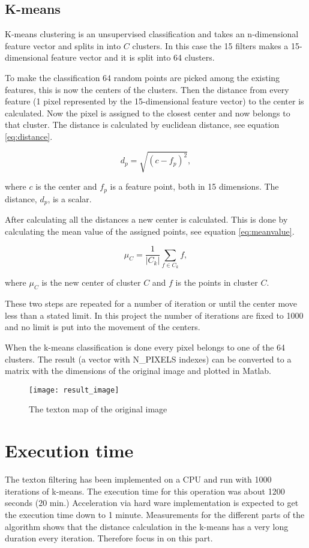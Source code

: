 \subsection{K-means}
\label{sec:Kmeans}
K-means clustering is an unsupervised classification and takes an n-dimensional feature vector and splits in into $C$ clusters. 
In this case the 15 filters makes a 15-dimensional feature vector and it is split into 64 clusters. 

To make the classification 64 random points are picked among the existing features, this is now the centers of the clusters. 
Then the distance from every feature (1 pixel represented by the 15-dimensional feature vector) to the center is calculated. 
Now the pixel is assigned to the closest center and now belongs to that cluster. 
The distance is calculated by euclidean distance, see equation \ref{eq:distance}.

\begin{equation}
\label{eq:distance}
d_p = \sqrt{(c-f_p)^2},
\end{equation}

where $c$ is the center and $f_p$ is a feature point, both in 15 dimensions. The distance, $d_p$, is a scalar.

After calculating all the distances a new center is calculated. 
This is done by calculating the mean value of the assigned points, see equation \ref{eq:meanvalue}.

\begin{equation}
\label{eq:meanvalue}
\mu_C = \frac{1}{|C_k|}\sum_{f\in C_k}f,
\end{equation}

where $\mu_C$ is the new center of cluster $C$ and $f$ is the points in cluster $C$.

These two steps are repeated for a number of iteration or until the center move less than a stated limit. 
In this project the number of iterations are fixed to 1000 and no limit is put into the movement of the centers.

When the k-means classification is done every pixel belongs to one of the 64 clusters. 
The result (a vector with N\_PIXELS indexes) can be 
converted to a matrix with the dimensions of the 
original image and plotted in Matlab.

\begin{figure}[H]
\centering
\texttt{[image: result\_image]}
\caption{The texton map of the original image}
\label{fig:result}
\end{figure}



\section{Execution time}
The texton filtering has been implemented on a CPU and run with 1000 iterations of k-means. 
The execution time for this operation was about 1200 seconds (20 min.) 
Acceleration via hard ware implementation is expected to get the execution time down to 1 minute. 
Measurements for the different parts of the algorithm shows that the distance calculation in the k-means has a very long duration every iteration. 
Therefore focus in on this part.

